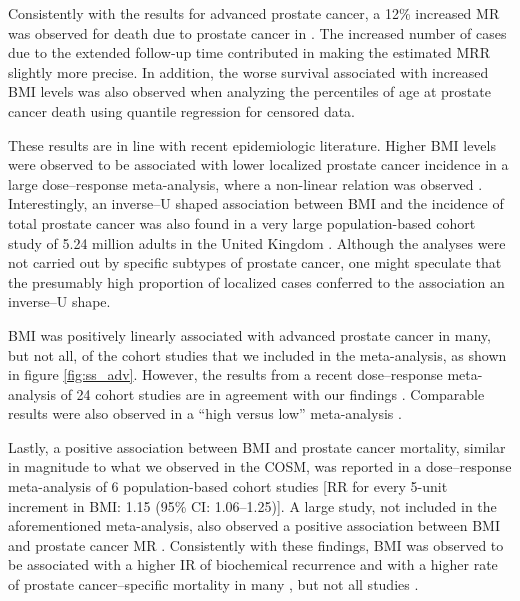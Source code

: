 Consistently with the results for advanced prostate cancer, a 12\% increased MR was observed for death due to prostate cancer in . The increased number of cases due to the extended follow-up time contributed in making the estimated MRR slightly more precise. In addition, the worse survival associated with increased BMI levels was also observed when analyzing the percentiles of age at prostate cancer death using quantile regression for censored data.

These results are in line with recent epidemiologic literature. Higher BMI levels were observed to be associated with lower localized prostate cancer incidence in a large dose--response meta-analysis, where a non-linear relation was observed \citep{wcrf_continuous_2014}.  Interestingly, an inverse--U shaped association between BMI and the incidence of total prostate cancer was also found in a very large population-based cohort study of 5.24 million adults in the United Kingdom \citep{bhaskaran_bodymass_2014}. Although the analyses were not carried out by specific subtypes of prostate cancer, one might speculate that the presumably high proportion of localized cases conferred to the association an inverse--U shape.

BMI was positively linearly associated with advanced prostate cancer in many, but not all, of the cohort studies that we included in the meta-analysis, as shown in figure \ref{fig:ss_adv}. However, the results from a recent dose--response meta-analysis of 24 cohort studies are in agreement with our findings \citep{wcrf_continuous_2014}. Comparable results were also observed in a ``high versus low'' meta-analysis \citep{zhang_impact_2015}. 

Lastly, a positive association between BMI and prostate cancer mortality, similar in magnitude to what we observed in the COSM, was reported in a dose--response meta-analysis of 6 population-based cohort studies [RR for every 5-unit increment in BMI: 1.15 (95\% CI: 1.06--1.25)]\citep{cao_body_2011}. A large study, not included in the aforementioned meta-analysis, also observed a positive association between BMI and prostate cancer MR \citep{haggstrom_prospective_2012}.  Consistently with these findings, BMI was observed to be associated with a higher IR of biochemical recurrence \citep{bassett_impact_2005, strom_obesity_2005, strom_influence_2006, efstathiou_influence_2007, palma_obesity_2007, ly_association_2010, cao_body_2011} and with a higher rate of prostate cancer--specific mortality in many \citep{efstathiou_obesity_2007, gong_obesity_2007, ma_prediagnostic_2008, cao_body_2011, cantarutti_body_2015}, but not all studies \citep{bonn_body_2014}.  

